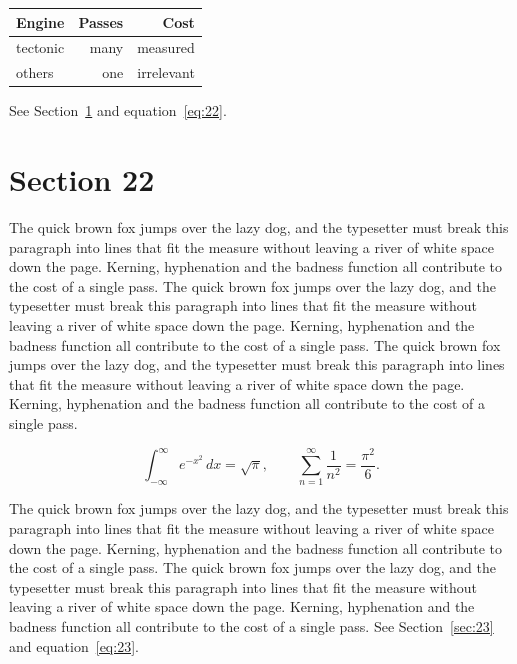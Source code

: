\documentclass{article}
\begin{document}
\begin{center}
\begin{tabular}{lrr}
\toprule
Engine & Passes & Cost \\
\midrule
tectonic & many & measured \\
others & one & irrelevant \\
\bottomrule
\end{tabular}
\end{center}

See Section~\ref{sec:22} and equation~\eqref{eq:22}.
\section{Section 22}
\label{sec:22}
The quick brown fox jumps over the lazy dog, and the typesetter must break this paragraph into lines that fit the measure without leaving a river of white space down the page. Kerning, hyphenation and the badness function all contribute to the cost of a single pass. The quick brown fox jumps over the lazy dog, and the typesetter must break this paragraph into lines that fit the measure without leaving a river of white space down the page. Kerning, hyphenation and the badness function all contribute to the cost of a single pass. The quick brown fox jumps over the lazy dog, and the typesetter must break this paragraph into lines that fit the measure without leaving a river of white space down the page. Kerning, hyphenation and the badness function all contribute to the cost of a single pass. 

\begin{equation}\label{eq:22}
\int_{-\infty}^{\infty} e^{-x^{2}}\,dx = \sqrt{\pi}, \qquad
\sum_{n=1}^{\infty} \frac{1}{n^{2}} = \frac{\pi^{2}}{6}.
\end{equation}

The quick brown fox jumps over the lazy dog, and the typesetter must break this paragraph into lines that fit the measure without leaving a river of white space down the page. Kerning, hyphenation and the badness function all contribute to the cost of a single pass. The quick brown fox jumps over the lazy dog, and the typesetter must break this paragraph into lines that fit the measure without leaving a river of white space down the page. Kerning, hyphenation and the badness function all contribute to the cost of a single pass. 
See Section~\ref{sec:23} and equation~\eqref{eq:23}.
\end{document}
